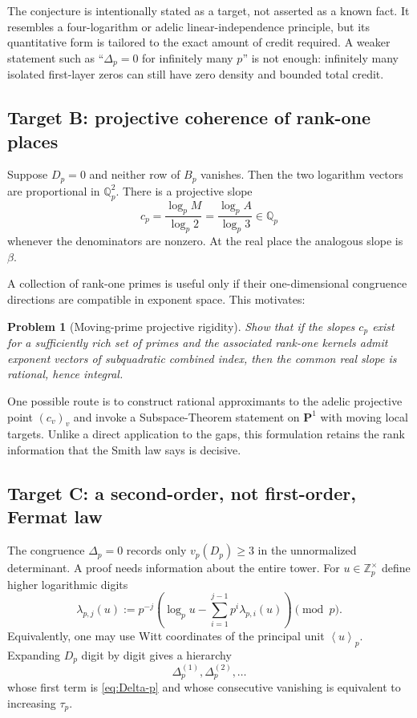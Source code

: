 \documentclass[11pt,oneside]{article}
\newtheorem{problem}[theorem]{Problem}
\theoremstyle{definition}
\newcommand{\Q}{\mathbb{Q}}
\newcommand{\Z}{\mathbb{Z}}
\newcommand{\ang}[1]{\left\langle #1\right\rangle}
\begin{document}
The conjecture is intentionally stated as a target, not asserted as a
known fact.  It resembles a four-logarithm or adelic linear-independence
principle, but its quantitative form is tailored to the exact amount of
credit required.  A weaker statement such as ``$\Delta_p=0$ for infinitely
many $p$'' is not enough: infinitely many isolated first-layer zeros can
still have zero density and bounded total credit.

\subsection{Target B: projective coherence of rank-one places}

Suppose $D_p=0$ and neither row of $B_p$ vanishes.  Then the two logarithm
vectors are proportional in $\Q_p^2$.  There is a projective slope
\begin{equation}\label{eq:cp}
  c_p
  =\frac{\log_pM}{\log_p2}
  =\frac{\log_pA}{\log_p3}
  \in\Q_p
\end{equation}
whenever the denominators are nonzero.  At the real place the analogous
slope is $\beta$.

A collection of rank-one primes is useful only if their one-dimensional
congruence directions are compatible in exponent space.  This motivates:

\begin{problem}[Moving-prime projective rigidity]\label{prob:projective-rigidity}
Show that if the slopes $c_p$ exist for a sufficiently rich set of primes
and the associated rank-one kernels admit exponent vectors of subquadratic
combined index, then the common real slope is rational, hence integral.
\end{problem}

One possible route is to construct rational approximants to the adelic
projective point $(c_v)_v$ and invoke a Subspace-Theorem statement on
$\mathbf P^1$ with moving local targets.  Unlike a direct application to
the gaps, this formulation retains the rank information that the Smith
law says is decisive.

\subsection{Target C: a second-order, not first-order, Fermat law}

The congruence $\Delta_p=0$ records only $v_p(D_p)\ge3$ in the unnormalized
determinant.  A proof needs information about the entire tower.  For
$u\in\Z_p^\times$ define higher logarithmic digits
\begin{equation}\label{eq:higher-digits}
  \lambda_{p,j}(u)
  :=p^{-j}\left(
      \log_pu-\sum_{i=1}^{j-1}p^i\lambda_{p,i}(u)
    \right)\pmod p.
\end{equation}
Equivalently, one may use Witt coordinates of the principal unit
$\ang{u}_p$.  Expanding $D_p$ digit by digit gives a hierarchy
\begin{equation}\label{eq:Witt-hierarchy}
  \Delta_p^{(1)},\Delta_p^{(2)},\ldots
\end{equation}
whose first term is \eqref{eq:Delta-p} and whose consecutive vanishing is
equivalent to increasing $\tau_p$.
\end{document}
